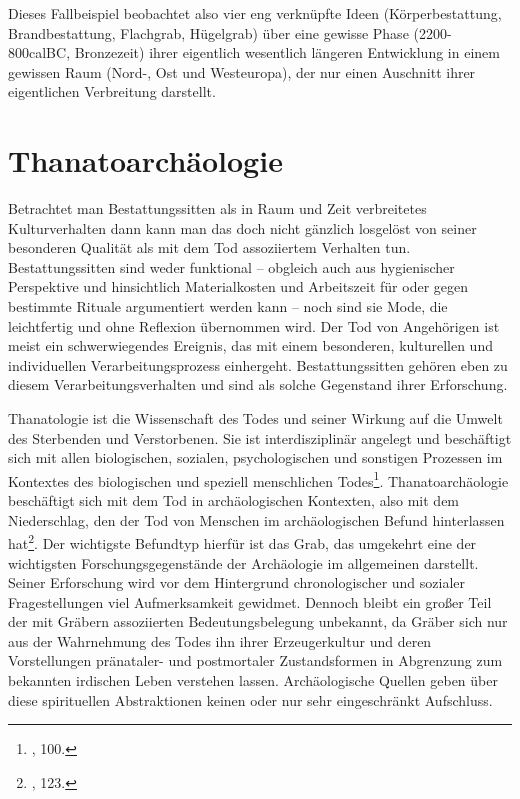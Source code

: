 \documentclass[openany,twoside,twocolumn]{book}
\let\rmarkdownfootnote\footnote%
\def\footnote{\protect\rmarkdownfootnote}
\begin{document}
Dieses Fallbeispiel beobachtet also vier eng verknüpfte Ideen
(Körperbestattung, Brandbestattung, Flachgrab, Hügelgrab) über eine
gewisse Phase (2200-800calBC, Bronzezeit) ihrer eigentlich wesentlich
längeren Entwicklung in einem gewissen Raum (Nord-, Ost und Westeuropa),
der nur einen Auschnitt ihrer eigentlichen Verbreitung darstellt.

\hypertarget{thanatoarchaologie}{%
\section{Thanatoarchäologie}\label{thanatoarchaologie}}

Betrachtet man Bestattungssitten als in Raum und Zeit verbreitetes
Kulturverhalten dann kann man das doch nicht gänzlich losgelöst von
seiner besonderen Qualität als mit dem Tod assoziiertem Verhalten tun.
Bestattungssitten sind weder funktional -- obgleich auch aus
hygienischer Perspektive und hinsichtlich Materialkosten und Arbeitszeit
für oder gegen bestimmte Rituale argumentiert werden kann -- noch sind
sie Mode, die leichtfertig und ohne Reflexion übernommen wird. Der Tod
von Angehörigen ist meist ein schwerwiegendes Ereignis, das mit einem
besonderen, kulturellen und individuellen Verarbeitungsprozess
einhergeht. Bestattungssitten gehören eben zu diesem
Verarbeitungsverhalten und sind als solche Gegenstand ihrer Erforschung.

Thanatologie ist die Wissenschaft des Todes und seiner Wirkung auf die
Umwelt des Sterbenden und Verstorbenen. Sie ist interdisziplinär
angelegt und beschäftigt sich mit allen biologischen, sozialen,
psychologischen und sonstigen Prozessen im Kontextes des biologischen
und speziell menschlichen Todes\footnote{\textcite{hofmann_rituelle_2008},
  100.}. Thanatoarchäologie beschäftigt sich mit dem Tod in
archäologischen Kontexten, also mit dem Niederschlag, den der Tod von
Menschen im archäologischen Befund hinterlassen hat\footnote{\textcite{hofmann_rituelle_2008},
  123.}. Der wichtigste Befundtyp hierfür ist das Grab, das umgekehrt
eine der wichtigsten Forschungsgegenstände der Archäologie im
allgemeinen darstellt. Seiner Erforschung wird vor dem Hintergrund
chronologischer und sozialer Fragestellungen viel Aufmerksamkeit
gewidmet. Dennoch bleibt ein großer Teil der mit Gräbern assoziierten
Bedeutungsbelegung unbekannt, da Gräber sich nur aus der Wahrnehmung des
Todes ihn ihrer Erzeugerkultur und deren Vorstellungen pränataler- und
postmortaler Zustandsformen in Abgrenzung zum bekannten irdischen Leben
verstehen lassen. Archäologische Quellen geben über diese spirituellen
Abstraktionen keinen oder nur sehr eingeschränkt Aufschluss.
\end{document}
